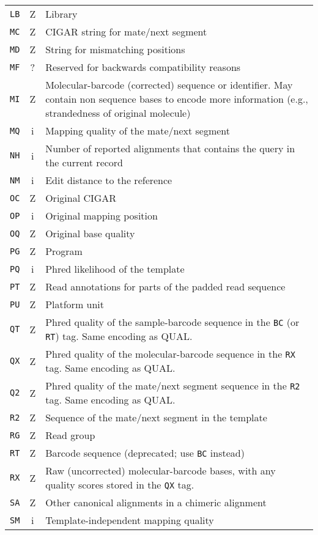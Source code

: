 \documentclass[10pt]{article}
\begin{document}
\begin{center}
\begin{longtable}{ccp{12.5cm}}
  {\tt LB} & Z & Library \\
  {\tt MC} & Z & CIGAR string for mate/next segment\\
  {\tt MD} & Z & String for mismatching positions \\
  {\tt MF} & ? & Reserved for backwards compatibility reasons \\
  {\tt MI} & Z & Molecular-barcode (corrected) sequence or identifier. May contain non sequence bases to encode more information (e.g., strandedness of original molecule) \\
  {\tt MQ} & i & Mapping quality of the mate/next segment \\
  {\tt NH} & i & Number of reported alignments that contains the query in the current record\\
  {\tt NM} & i & Edit distance to the reference \\
  {\tt OC} & Z & Original CIGAR \\
  {\tt OP} & i & Original mapping position \\
  {\tt OQ} & Z & Original base quality \\
  {\tt PG} & Z & Program \\
  {\tt PQ} & i & Phred likelihood of the template \\
  {\tt PT} & Z & Read annotations for parts of the padded read sequence \\
  {\tt PU} & Z & Platform unit \\
  {\tt QT} & Z & Phred quality of the sample-barcode sequence in the {\tt BC} (or {\tt RT}) tag. Same encoding as {\sf QUAL}. \\
  {\tt QX} & Z & Phred quality of the molecular-barcode sequence in the {\tt RX} tag. Same encoding as {\sf QUAL}. \\
  {\tt Q2} & Z & Phred quality of the mate/next segment sequence in the {\tt R2} tag. Same encoding as {\sf QUAL}.\\
  {\tt R2} & Z & Sequence of the mate/next segment in the template \\
  {\tt RG} & Z & Read group \\
  {\tt RT} & Z & Barcode sequence (deprecated; use {\tt BC} instead) \\
  {\tt RX} & Z & Raw (uncorrected) molecular-barcode bases, with any quality scores stored in the {\tt QX} tag. \\
  {\tt SA} & Z & Other canonical alignments in a chimeric alignment \\
  {\tt SM} & i & Template-independent mapping quality \\

\end{longtable}
\end{center}
\end{document}
